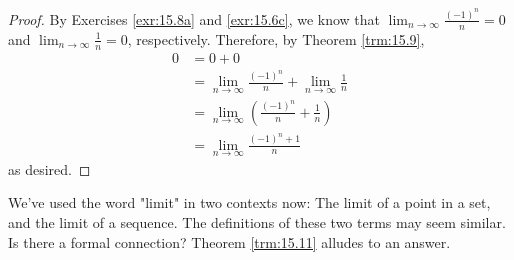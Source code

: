 \documentclass[../main.tex]{subfiles}
\begin{document}
\begin{exercise}
\begin{enumerate}[label={(\alph*)},ref={\theexercise\alph*}]
        \begin{proof}
            By Exercises \ref{exr:15.8a} and \ref{exr:15.6c}, we know that $\lim_{n\to\infty}\frac{(-1)^n}{n}=0$ and $\lim_{n\to\infty}\frac{1}{n}=0$, respectively. Therefore, by Theorem \ref{trm:15.9},
            \begin{align*}
                0 &= 0+0\\
                &= \lim_{n\to\infty}\frac{(-1)^n}{n}+\lim_{n\to\infty}\frac{1}{n}\\
                &= \lim_{n\to\infty}\left( \frac{(-1)^n}{n}+\frac{1}{n} \right)\\
                &= \lim_{n\to\infty}\frac{(-1)^n+1}{n}
            \end{align*}
            as desired.
        \end{proof}
    \end{enumerate}
\end{exercise}

We've used the word "limit" in two contexts now: The limit of a point in a set, and the limit of a sequence. The definitions of these two terms may seem similar. Is there a formal connection? Theorem \ref{trm:15.11} alludes to an answer.
\end{document}
